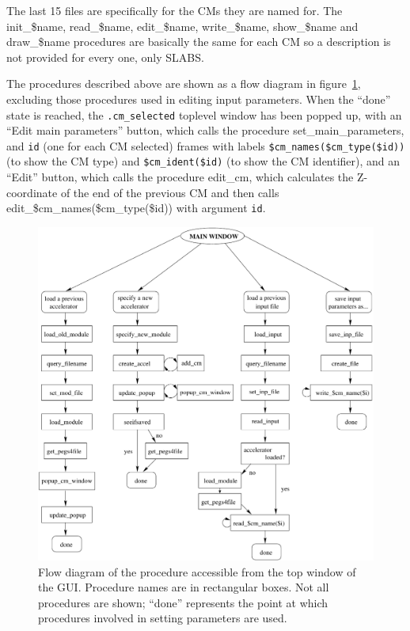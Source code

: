 \documentclass[12pt]{book}
\begin{document}
The last 15 files are specifically for the CMs they are named for.  The
{\sf init\_\$name}, {\sf read\_\$name}, {\sf edit\_\$name}, {\sf
write\_\$name}, {\sf show\_\$name} and {\sf draw\_\$name} procedures
are basically the same for each CM so a description is not provided for
every one, only SLABS.


The procedures described above are shown as a flow diagram in
figure~\ref{flowfig}, excluding those procedures used in editing input
parameters.  When the ``done'' state is reached, the {\tt .cm\_selected}
toplevel window has been popped up, with an ``Edit main parameters''
button, which calls the procedure {\sf set\_main\_parameters}, and {\tt id}
(one for each CM selected) frames
with labels {\tt \$cm\_names(\$cm\_type(\$id))} (to show the CM type) and
{\tt \$cm\_ident(\$id)} (to show the CM identifier), and an ``Edit''
button, which calls the procedure
{\sf edit\_cm}, which calculates the Z-coordinate of the end of the previous CM
and then calls {\sf edit\_\$cm\_names(\$cm\_type(\$id))} with argument
{\tt id}.

\begin{figure}[p]
\includegraphics[width=\textwidth]{figures/main_flow_portrait}
\caption{Flow diagram of the procedure accessible from the top window of
the GUI.  Procedure names are in rectangular boxes.  Not all procedures
are shown;  ``done'' represents the point at which procedures involved in
setting parameters are used.\label{flowfig}}
\end{figure}
\end{document}
